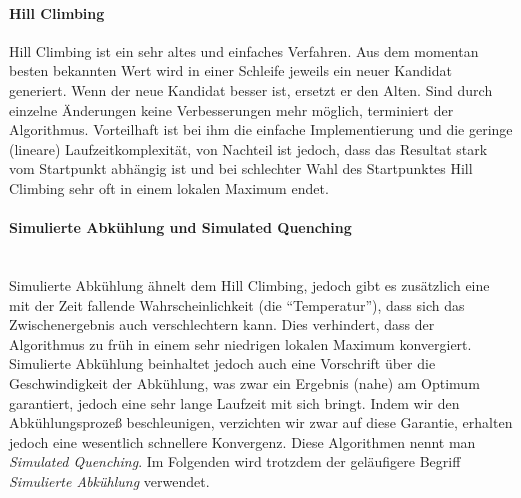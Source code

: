 \paragraph{Hill Climbing}
Hill Climbing ist ein sehr altes und einfaches Verfahren.
Aus dem momentan besten bekannten Wert wird in einer Schleife jeweils ein neuer Kandidat generiert. Wenn der neue Kandidat besser ist, ersetzt er den Alten.
Sind durch einzelne Änderungen keine Verbesserungen mehr möglich, terminiert der Algorithmus.
Vorteilhaft ist bei ihm die einfache Implementierung und die geringe (lineare) Laufzeitkomplexität, von Nachteil ist jedoch, dass das Resultat stark vom Startpunkt abhängig ist 
und bei schlechter Wahl des Startpunktes Hill Climbing sehr oft in einem lokalen Maximum endet.
\paragraph{Simulierte Abkühlung und Simulated Quenching}~\\
Simulierte Abkühlung ähnelt dem Hill Climbing, jedoch gibt es zusätzlich eine mit der Zeit fallende Wahrscheinlichkeit (die "`Temperatur"'), dass sich das Zwischenergebnis auch verschlechtern kann.
Dies verhindert, dass der Algorithmus zu früh in einem sehr niedrigen lokalen Maximum konvergiert.
Simulierte Abkühlung beinhaltet jedoch auch eine Vorschrift über die Geschwindigkeit der Abkühlung, was zwar ein Ergebnis (nahe) am Optimum garantiert, jedoch eine sehr lange Laufzeit mit sich bringt.
Indem wir den Abkühlungsprozeß beschleunigen, verzichten wir zwar auf diese Garantie, erhalten jedoch eine wesentlich schnellere Konvergenz. Diese Algorithmen nennt man \emph{Simulated Quenching}.\footnotemark{}
Im Folgenden wird trotzdem der geläufigere Begriff \emph{Simulierte Abkühlung} verwendet.

